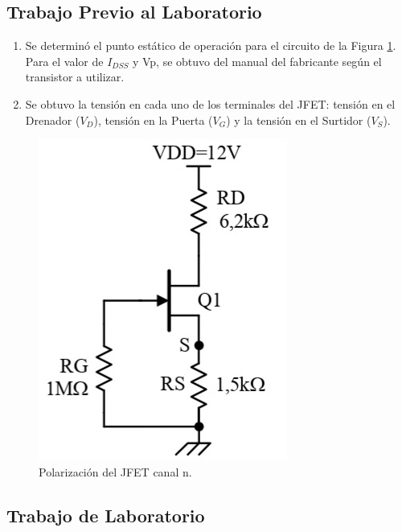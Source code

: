 \documentclass[12pt, a4paper]{article}
\begin{document}
    \subsection{Trabajo Previo al Laboratorio}

    \begin{enumerate}
        \item \label{p11}	Se determinó el punto estático de operación para el circuito de la Figura \ref{fig:cir1}. Para el valor de $I_{DSS}$ y Vp, se obtuvo del manual del fabricante según el transistor a utilizar.
        \item \label{p12}	Se obtuvo la tensión en cada uno de los terminales del JFET: tensión en el Drenador ($V_D$), tensión en la Puerta ($V_G$) y la tensión en el Surtidor ($V_S$).
    \end{enumerate}

    \begin{figure}[h!]
        \centering
        \includegraphics[height=5cm\textwidth]{circuito1.jpg}
        \caption{Polarización del JFET canal n.}
        \label{fig:cir1}
    \end{figure}

    \subsection{Trabajo de Laboratorio}
\end{document}
